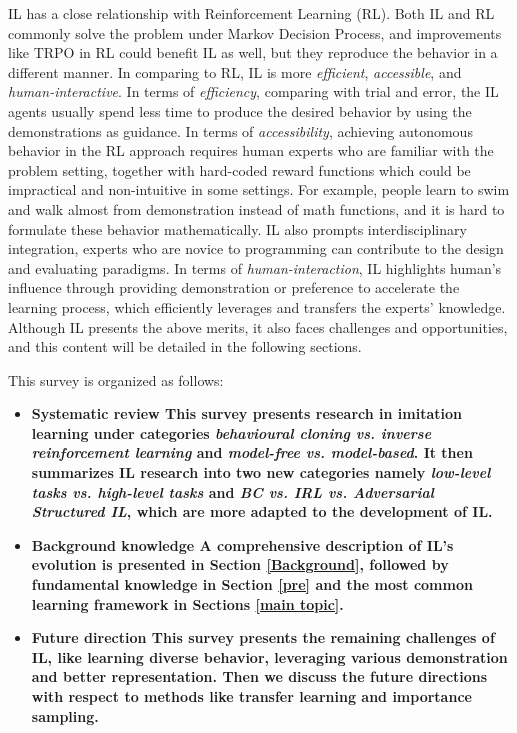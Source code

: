 \documentclass[acmsmall]{acmart}
\begin{document}
IL has a close relationship with Reinforcement Learning (RL). Both IL and RL commonly solve the problem under Markov Decision Process, and improvements like TRPO\cite{schulmanTrustRegionPolicy2017} in RL could benefit IL as well, but they reproduce the behavior in a different manner. In comparing to RL, IL is more \textit{efficient}, \textit{accessible}, and \textit{human-interactive}. In terms of \textit{efficiency}, comparing with trial and error, the IL agents usually spend less time to produce the desired behavior by using the demonstrations as guidance. In terms of \textit{accessibility}, achieving autonomous behavior in the RL approach requires human experts who are familiar with the problem setting, together with hard-coded reward functions which could be impractical and non-intuitive in some settings. For example, people learn to swim and walk almost from demonstration instead of math functions, and it is hard to formulate these behavior mathematically. IL also prompts interdisciplinary integration, experts who are novice to programming can contribute to the design and evaluating paradigms. In terms of \textit{human-interaction}, IL highlights human's influence through providing demonstration or preference to accelerate the learning process, which efficiently leverages and transfers the experts' knowledge. Although IL presents the above merits, it also faces challenges and opportunities, and this content will be detailed in the following sections.

This survey is organized as follows:
\begin{itemize}
\item {\bf{Systematic review} \textnormal{This survey presents research in imitation learning under categories \textit{behavioural cloning vs. inverse reinforcement learning} and \textit{model-free vs. model-based}. It then summarizes IL research into two new categories namely \textit{low-level tasks vs. high-level tasks} and \textit{BC vs. IRL vs. Adversarial Structured IL}, which are more adapted to the development of IL.}}
\item \bf{Background knowledge} \textnormal{A comprehensive description of IL's evolution is presented in Section \ref{Background}, followed by fundamental knowledge in Section \ref{pre} and the most common learning framework in Sections \ref{main topic}.}
\item \bf{Future direction} \textnormal{This survey presents the remaining challenges of IL, like learning diverse behavior, leveraging various demonstration and better representation. Then we discuss the future directions with respect to methods like transfer learning and importance sampling.}
\end{itemize}
\end{document}
